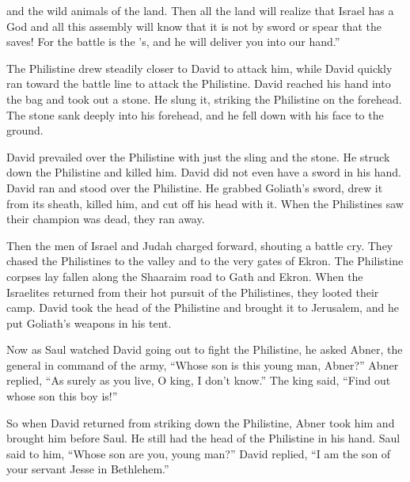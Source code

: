 {and the wild animals
of the land.
Then all
the land
will realize
that
Israel
has a God
and all
this
assembly
will know
that
it is not
by sword
or spear
that
the {}
saves! For
the battle
is
the
{}’s,
and he will deliver
you into our hand.”
\par }{\PP {}The Philistine
drew
steadily closer to David to attack
him,
while David
quickly
ran
toward the battle line
to attack
the Philistine.
David
reached
his hand
into
the bag
and took
out a stone.
He slung
it, striking
the
Philistine
on the forehead.
The stone
sank
deeply into
his forehead,
and he fell
down with his face
to the ground.
\par }{\PP David
prevailed
over the Philistine
with just the sling
and the stone.
He struck
down the
Philistine
and killed
him. David
did not
even have a sword
in his hand.
David
ran
and stood
over
the Philistine.
He grabbed
Goliath’s sword,
drew
it from its sheath,
killed
him, and cut off
his head
with it. When the Philistines
saw
their champion
was dead,
they ran away.
\par }{\PP {}Then the men
of Israel
and Judah
charged forward,
shouting
a battle cry. They chased
the Philistines
to
the valley
and to the very gates
of Ekron.
The Philistine
corpses
lay fallen
along the Shaaraim
road
to
Gath
and Ekron.
When the Israelites
returned
from their hot
pursuit
of the Philistines,
they looted
their camp.
David
took
the
head
of the Philistine
and brought
it to Jerusalem,
and he put Goliath’s
weapons
in his tent.
\par }{\PP Now as Saul
watched
David
going out
to fight
the Philistine,
he asked
Abner,
the general in command
of the army,
“Whose
son
is this
young man,
Abner?” Abner
replied,
“As surely
as you live,
O king,
I don’t know.”
The king
said,
“Find
out whose
son
this
boy is!”
\par }{\PP {}So when David
returned
from striking
down the Philistine,
Abner
took
him and brought
him before
Saul.
He still had the head
of the Philistine
in his hand.
Saul
said
to him,
“Whose
son
are you,
young man?” David
replied,
“I am the son
of your servant
Jesse
in Bethlehem.”


}
